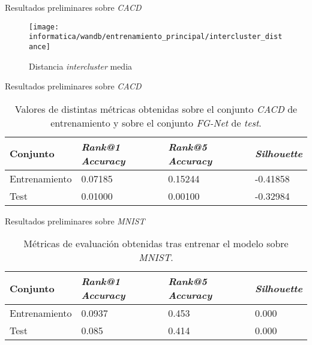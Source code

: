 \begin{frame}{Resultados preliminares sobre \textit{CACD}}
	\begin{figure}
		\texttt{[image: informatica/wandb/entrenamiento\_principal/intercluster\_distance]}
		\caption{Distancia \textit{intercluster} media}
	\end{figure}

\end{frame}

\begin{frame}{Resultados preliminares sobre \textit{CACD}}
	\begin{table}
		\centering
		\begin{tabular}{|l|l|l|l|}
			\hline
			Conjunto      & \textit{Rank@1 Accuracy} & \textit{Rank@5 Accuracy} & \textit{Silhouette} \\
			\hline

			Entrenamiento & 0.07185                  & 0.15244                  & -0.41858            \\
			Test          & 0.01000                  & 0.00100                  & -0.32984            \\
			\hline
		\end{tabular}
		\caption{Valores de distintas métricas obtenidas sobre el conjunto \textit{CACD} de entrenamiento y sobre el conjunto \textit{FG-Net} de \textit{test}.}
		\label{table:resultados_sobre_fg_net}
	\end{table}

\end{frame}

\begin{frame}{Resultados preliminares sobre \textit{MNIST}}

	\begin{table}
		\centering
		\begin{tabular}{|l|l|l|l|}
			\hline
			Conjunto      & \textit{Rank@1 Accuracy} & \textit{Rank@5 Accuracy} & \textit{Silhouette} \\
			\hline

			Entrenamiento & 0.0937                   & 0.453                    & 0.000               \\
			Test          & 0.085                    & 0.414                    & 0.000               \\


			\hline
		\end{tabular}
		\caption{Métricas de evaluación obtenidas tras entrenar el modelo sobre \textit{MNIST}.}
		\label{table:resultados_mnist_mal}
	\end{table}

\end{frame}


